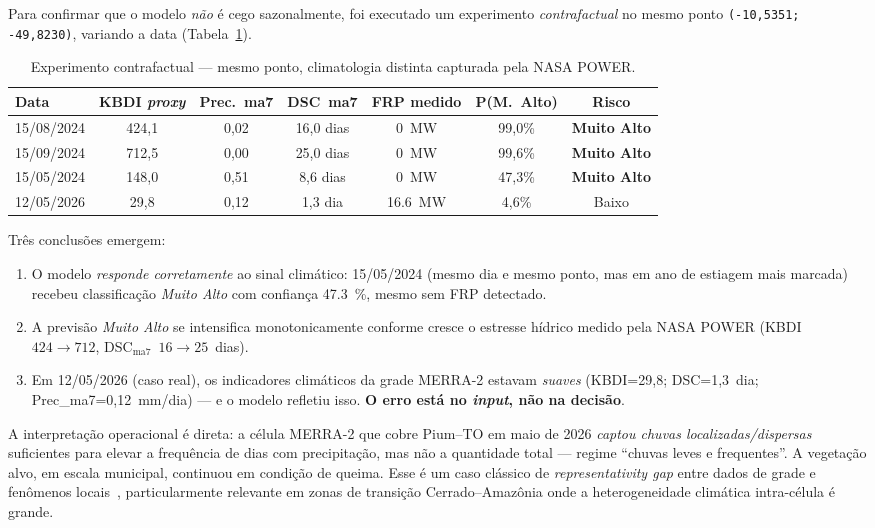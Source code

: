Para confirmar que o modelo \emph{não} é cego sazonalmente, foi executado um experimento \emph{contrafactual} no mesmo ponto \texttt{(-10{,}5351; -49{,}8230)}, variando a data (Tabela~\ref{tab:pium_contrafactual}).

\begin{table}[h]
\centering
\caption{Experimento contrafactual --- mesmo ponto, climatologia distinta capturada pela NASA POWER.}
\label{tab:pium_contrafactual}
\small
\begin{tabular}{lcccccc}
\toprule
\textbf{Data} & \textbf{KBDI \emph{proxy}} & \textbf{Prec.~ma7} & \textbf{DSC~ma7} & \textbf{FRP medido} & \textbf{P(M.~Alto)} & \textbf{Risco} \\
\midrule
15/08/2024 & 424,1 & 0,02 & 16,0 dias  & \SI{0}{\mega\watt} & 99,0\% & \textbf{Muito Alto} \\
15/09/2024 & 712,5 & 0,00 & 25,0 dias  & \SI{0}{\mega\watt} & 99,6\% & \textbf{Muito Alto} \\
15/05/2024 & 148,0 & 0,51 & 8,6 dias   & \SI{0}{\mega\watt} & 47,3\% & \textbf{Muito Alto} \\
12/05/2026 & 29,8  & 0,12 & 1,3 dia    & \SI{16,6}{\mega\watt} & 4,6\% & Baixo \\
\bottomrule
\end{tabular}
\end{table}

Três conclusões emergem:

\begin{enumerate}
  \item O modelo \emph{responde corretamente} ao sinal climático: 15/05/2024 (mesmo dia e mesmo ponto, mas em ano de estiagem mais marcada) recebeu classificação \emph{Muito Alto} com confiança \SI{47,3}{\percent}, mesmo sem FRP detectado.
  \item A previsão \emph{Muito Alto} se intensifica monotonicamente conforme cresce o estresse hídrico medido pela NASA POWER (KBDI~$424 \to 712$, DSC$_\text{ma7}$~$16 \to 25$~dias).
  \item Em 12/05/2026 (caso real), os indicadores climáticos da grade MERRA-2 estavam \emph{suaves} (KBDI=29,8; DSC=1,3~dia; Prec\_ma7=0,12~mm/dia) --- e o modelo refletiu isso. \textbf{O erro está no \emph{input}, não na decisão}.
\end{enumerate}

A interpretação operacional é direta: a célula MERRA-2 que cobre Pium--TO em maio de 2026 \emph{captou chuvas localizadas/dispersas} suficientes para elevar a frequência de dias com precipitação, mas não a quantidade total --- regime ``chuvas leves e frequentes''. A vegetação alvo, em escala municipal, continuou em condição de queima. Esse é um caso clássico de \emph{representativity gap} entre dados de grade e fenômenos locais~\cite{seager2015climatology}, particularmente relevante em zonas de transição Cerrado--Amazônia onde a heterogeneidade climática intra-célula é grande.

